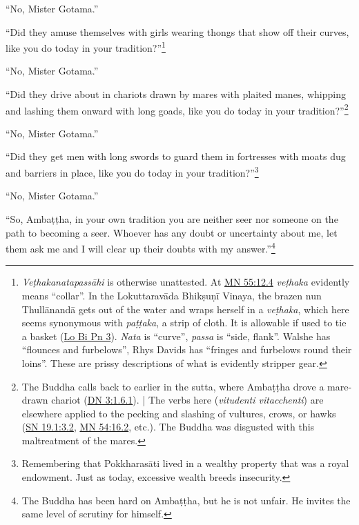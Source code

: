 \documentclass[12pt,openany]{book}%
\begin{document}
“No, Mister Gotama.” 

“Did they amuse themselves with girls wearing thongs that show off their curves, like you do today in your tradition?”\footnote{\textit{\textsanskrit{Veṭhakanatapassāhi}} is otherwise unattested. At \href{https://suttacentral.net/mn55/en/sujato\#12.4}{MN 55:12.4} \textit{\textsanskrit{veṭhaka}} evidently means “collar”. In the \textsanskrit{Lokuttaravāda} \textsanskrit{Bhikṣuṇī} Vinaya, the brazen nun \textsanskrit{Thullānandā} gets out of the water and wraps herself in a \textit{\textsanskrit{veṭhaka}}, which here seems synonymous with \textit{\textsanskrit{paṭṭaka}}, a strip of cloth. It is allowable if used to tie a basket (\href{https://suttacentral.net/san-lo-bi-pn3}{Lo Bi Pn 3}). \textit{Nata} is “curve”, \textit{passa} is “side, flank”. Walshe has “flounces and furbelows”, Rhys Davids has “fringes and furbelows round their loins”. These are prissy descriptions of what is evidently stripper gear. } 

“No, Mister Gotama.” 

“Did they drive about in chariots drawn by mares with plaited manes, whipping and lashing them onward with long goads, like you do today in your tradition?”\footnote{The Buddha calls back to earlier in the sutta, where \textsanskrit{Ambaṭṭha} drove a mare-drawn chariot (\href{https://suttacentral.net/dn3/en/sujato\#1.6.1}{DN 3:1.6.1}). | The verbs here (\textit{vitudenti vitacchenti}) are elsewhere applied to the pecking and slashing of vultures, crows, or hawks (\href{https://suttacentral.net/sn19.1/en/sujato\#3.2}{SN 19.1:3.2}, \href{https://suttacentral.net/mn54/en/sujato\#16.2}{MN 54:16.2}, etc.). The Buddha was disgusted with this maltreatment of the mares. } 

“No, Mister Gotama.” 

“Did they get men with long swords to guard them in fortresses with moats dug and barriers in place, like you do today in your tradition?”\footnote{Remembering that \textsanskrit{Pokkharasāti} lived in a wealthy property that was a royal endowment. Just as today, excessive wealth breeds insecurity. } 

“No, Mister Gotama.” 

“So, \textsanskrit{Ambaṭṭha}, in your own tradition you are neither seer nor someone on the path to becoming a seer. Whoever has any doubt or uncertainty about me, let them ask me and I will clear up their doubts with my answer.”\footnote{The Buddha has been hard on \textsanskrit{Ambaṭṭha}, but he is not unfair. He invites the same level of scrutiny for himself. } 
\end{document}

